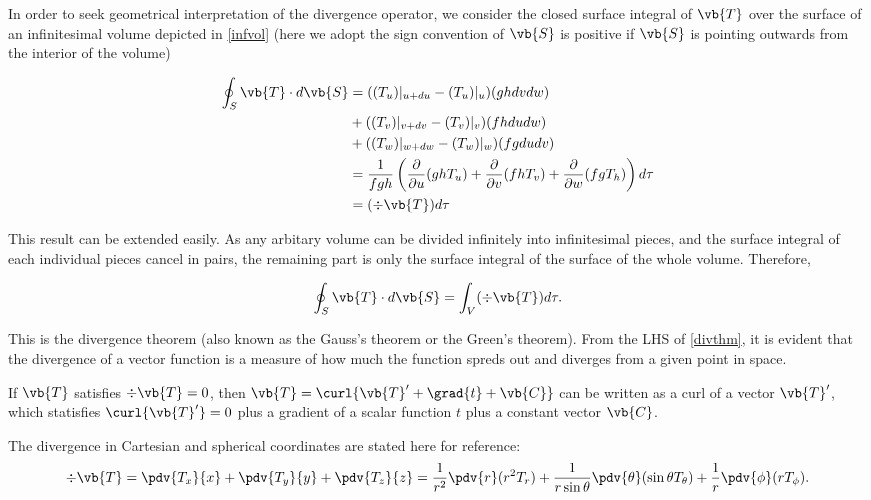 \documentclass[english,a4paper,12pt]{report}
\begin{document}
	
In order to seek geometrical interpretation of the divergence operator, we consider the closed surface integral of \(\vb{T}\) over the surface of an infinitesimal volume depicted in \cref{infvol} (here we adopt the sign convention of \(\vb{S}\) is positive if \(\vb{S}\) is pointing outwards from the interior of the volume)

\begin{equation} \label{divpre} 
	\begin{aligned} 
    \oint_{S} \vb{T} \cdot d\vb{S} &= ((T_u)|_{u+du} - (T_u)|_{u})(ghdvdw) \\ &+ ((T_v)|_{v+dv} - (T_v)|_{v})(fhdudw) \\ &+ ((T_w)|_{w+dw} - (T_w)|_{w})(fgdudv) \\
    &= \frac{1}{fgh} \left( 
		\frac{\partial}{\partial u} (ghT_{u} ) + 
		\frac{\partial}{\partial v} (fhT_{v} )+ 
		\frac{\partial}{\partial w} (fgT_{h} ) \right) d\tau \\
	&= (\div{\vb{T}}) d\tau
    \end{aligned} 
\end{equation} 
	
This result can be extended easily. As any arbitary volume can be divided infinitely into infinitesimal pieces, and the surface integral of each individual pieces cancel in pairs, the remaining part is only the surface integral of the surface of the whole volume. Therefore,
	
\begin{equation} 
	\oint_{S} \vb{T} \cdot d\vb{S} = \int_{V}(\div{\vb{T} }) d\tau \label{divthm}.  
\end{equation}
	
This is the divergence theorem (also known as the Gauss's theorem or the Green's theorem). From the LHS of \cref{divthm}, it is evident that the divergence of a vector function is a measure of how much the function spreds out and diverges from a given point in space.


If \(\vb{T} \) satisfies \(\div{\vb{T} } = 0 \), then \(\vb{T} = \curl{\vb{T} ' + \grad{t} + \vb{C} } \) can be written as a curl of a vector \(\vb{T} '\), which statisfies \(\curl{\vb{T} '} = 0 \) plus a gradient of a scalar function \(t\) plus a constant vector \(\vb{C} \).        

The divergence in Cartesian and spherical coordinates are stated here for reference:
\begin{equation} 
	\div{\vb{T}} = \pdv{T_x}{x} + \pdv{T_y}{y} + \pdv{T_z}{z} = \frac{1}{r^2}\pdv{r}(r^2T_r) + \frac{1}{r\sin{\theta}}\pdv{\theta}(\sin{\theta}T_{\theta}) + \frac{1}{r}\pdv{\phi}(rT_{\phi}). 
\end{equation}
	
\end{document}
